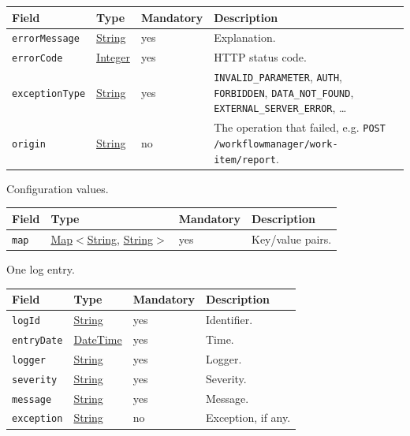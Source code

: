 \documentclass[a4paper]{arrowhead}
\newcommand{\pref}[1]{{\textcolor{ArrowheadGrey}{\hyperref[sec:model:primitives:#1]{#1}}}}
\begin{document}
{\small
\begin{longtable}{|p{3.7cm}|p{4.2cm}|p{1.6cm}|p{6.3cm}|}

\hline
\rowcolor{gray!33} Field & Type & Mandatory & Description \\ \hline
\endhead
\texttt{errorMessage} & \pref{String} & yes & Explanation. \\ \hline
\texttt{errorCode} & \pref{Integer} & yes & HTTP status code. \\ \hline
\texttt{exceptionType} & \pref{String} & yes & \texttt{INVALID\_PARAMETER}, \texttt{AUTH}, \texttt{FORBIDDEN}, \texttt{DATA\_NOT\_FOUND}, \texttt{EXTERNAL\_SERVER\_ERROR}, \ldots \\ \hline
\texttt{origin} & \pref{String} & no & The operation that failed, e.g. \texttt{POST /workflowmanager/work-item/report}. \\ \hline
\end{longtable}
}

Configuration values.

{\small
\begin{longtable}{|p{3.7cm}|p{4.2cm}|p{1.6cm}|p{6.3cm}|}

\hline
\rowcolor{gray!33} Field & Type & Mandatory & Description \\ \hline
\endhead
\texttt{map} & \pref{Map}$<$\pref{String}, \pref{String}$>$ & yes & Key/value pairs. \\ \hline
\end{longtable}
}

One log entry.

{\small
\begin{longtable}{|p{3.7cm}|p{4.2cm}|p{1.6cm}|p{6.3cm}|}

\hline
\rowcolor{gray!33} Field & Type & Mandatory & Description \\ \hline
\endhead
\texttt{logId} & \pref{String} & yes & Identifier. \\ \hline
\texttt{entryDate} & \pref{DateTime} & yes & Time. \\ \hline
\texttt{logger} & \pref{String} & yes & Logger. \\ \hline
\texttt{severity} & \pref{String} & yes & Severity. \\ \hline
\texttt{message} & \pref{String} & yes & Message. \\ \hline
\texttt{exception} & \pref{String} & no & Exception, if any. \\ \hline
\end{longtable}
}
\end{document}
